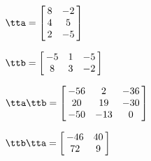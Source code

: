 {$\tta = \left[\hskip -3pt \begin{array}{cc} 8&-2\\  4&5
\\  2&-5\end{array}\hskip -3pt \right] $ 

$\ttb =  \left[\hskip -3pt \begin{array}{ccc} -5&1&-5\\  8&3&-2
\end{array}\hskip -3pt \right]  $}
{$\tta\ttb = \left[\hskip -3pt \begin{array}{ccc} -56&2&-36\\  20&19&-30
\\  -50&-13&0\end{array}\hskip -3pt \right] $

$\ttb\tta = \left[\hskip -3pt \begin{array}{cc} -46&40\\  72&9\end{array}\hskip -3pt \right]  $}



  

 

